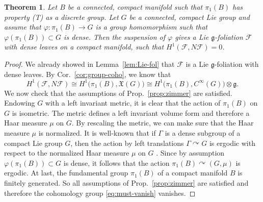 \documentclass[11pt, letterpaper, oneside,reqno]{amsart}
\theoremstyle{plain}
\newtheorem{thm}{Theorem}[section]
\theoremstyle{underline}
\theoremstyle{definition}
\theoremstyle{remark}
\begin{document}
	\begin{thm}\label{thm:main-result}
		Let $B$ be a connected, compact manifold such that $\pi_1(B)$ has property (T) as a discrete group. Let $G$ be a connected, compact Lie group and assume that $\varphi:\pi_1(B)\rightarrow G$ is a group homomorphism such that $\varphi(\pi_1(B))\subset G$ is dense. Then the suspension of $\varphi$ gives a Lie $\mathfrak{g}$-foliation $\mathcal{F}$ with dense leaves on a compact manifold, such that $H^{1}(\mathcal{F},N\mathcal{F})=0$.
	\end{thm}
	\begin{proof}
		We already showed in Lemma~\ref{lem:Lie-fol} that $\mathcal{F}$ is a Lie $\mathfrak{g}$-foliation with dense leaves. By Cor.~\ref{cor:group-coho}, we know that
		\begin{equation}\label{eq:must-vanish}
			H^{1}(\mathcal{F},N\mathcal{F})\cong H^{1}\big(\pi_1(B),\mathfrak{X}(G)\big)\cong H^{1}\big(\pi_1(B),C^{\infty}(G)\big)\otimes\mathfrak{g}.
		\end{equation}
		We now check that the assumptions of Prop.~\ref{prop:zimmer} are satisfied. Endowing $G$ with a left invariant metric, it is clear that the action of $\pi_1(B)$ on $G$ is isometric. The metric defines a left invariant volume form and therefore a Haar measure $\mu$ on $G$. By rescaling the metric, we can make sure that the Haar measure $\mu$ is normalized.
		It is well-known that if $\Gamma$ is a dense subgroup of a compact Lie group $G$, then the action by left translations $\Gamma\curvearrowright G$ is ergodic with respect to the normalized Haar measure $\mu$ on $G$ \cite[Lemma 2.4.1]{Popa}. Since by assumption $\varphi(\pi_1(B))\subset G$ is dense, it follows that the action $\pi_1(B)\curvearrowright (G,\mu)$ is ergodic. 
		At last, the fundamental group $\pi_1(B)$ of a compact manifold $B$ is finitely generated. So all assumptions of Prop.~\ref{prop:zimmer} are satisfied and therefore the cohomology group \eqref{eq:must-vanish} vanishes. 
	\end{proof}
	
\end{document}
